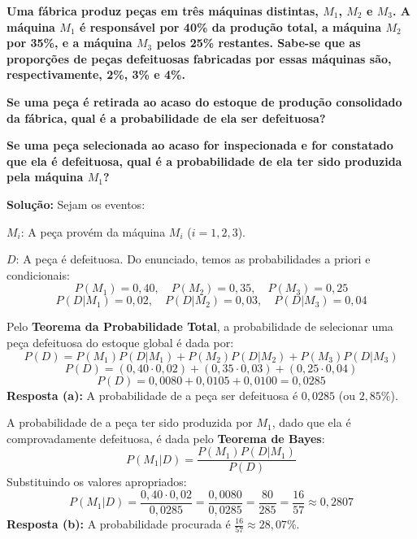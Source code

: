 \documentclass[a4paper,10pt,landscape,twocolumn]{article}  %
\let\oldenumerate\enumerate
\let\oldendenumerate\endenumerate
\renewenvironment{enumerate}{%
  \oldenumerate%
  \setlength{\itemsep}{1pt}%
  \setlength{\parskip}{0pt}%
  \setlength{\parsep}{0pt}%
  \setlength{\topsep}{2pt}%
  \setlength{\partopsep}{0pt}%
}{%
  \oldendenumerate%
}
\let\olditemize\itemize
\let\oldenditemize\enditemize
\renewenvironment{itemize}{%
  \olditemize%
  \setlength{\itemsep}{1pt}%
  \setlength{\parskip}{0pt}%
  \setlength{\parsep}{0pt}%
  \setlength{\topsep}{2pt}%
  \setlength{\partopsep}{0pt}%
}{%
  \oldenditemize%
}
\begin{document}
\begin{enumerate}
    \item \textbf{Uma fábrica produz peças em três máquinas distintas, $M_1$, $M_2$ e $M_3$. A máquina $M_1$ é responsável por 40\% da produção total, a máquina $M_2$ por 35\%, e a máquina $M_3$ pelos 25\% restantes. Sabe-se que as proporções de peças defeituosas fabricadas por essas máquinas são, respectivamente, 2\%, 3\% e 4\%.}
    \begin{enumerate}
        \item \textbf{Se uma peça é retirada ao acaso do estoque de produção consolidado da fábrica, qual é a probabilidade de ela ser defeituosa?}
        \item \textbf{Se uma peça selecionada ao acaso for inspecionada e for constatado que ela é defeituosa, qual é a probabilidade de ela ter sido produzida pela máquina $M_1$?}
    \end{enumerate}
    
    \textbf{Solução:}
    Sejam os eventos:
    \begin{itemize}
        \item $M_i$: A peça provém da máquina $M_i$ ($i = 1, 2, 3$).
        \item $D$: A peça é defeituosa.
    \end{itemize}
    Do enunciado, temos as probabilidades a priori e condicionais:
    \[ P(M_1) = 0{,}40, \quad P(M_2) = 0{,}35, \quad P(M_3) = 0{,}25 \]
    \[ P(D|M_1) = 0{,}02, \quad P(D|M_2) = 0{,}03, \quad P(D|M_3) = 0{,}04 \]
    
    \begin{enumerate}
        \item Pelo \textbf{Teorema da Probabilidade Total}, a probabilidade de selecionar uma peça defeituosa do estoque global é dada por:
        \[ P(D) = P(M_1)P(D|M_1) + P(M_2)P(D|M_2) + P(M_3)P(D|M_3) \]
        \[ P(D) = (0{,}40 \cdot 0{,}02) + (0{,}35 \cdot 0{,}03) + (0{,}25 \cdot 0{,}04) \]
        \[ P(D) = 0{,}0080 + 0{,}0105 + 0{,}0100 = 0{,}0285 \]
        \textbf{Resposta (a):} A probabilidade de a peça ser defeituosa é $0{,}0285$ (ou $2{,}85\%$).
        
        \item A probabilidade de a peça ter sido produzida por $M_1$, dado que ela é comprovadamente defeituosa, é dada pelo \textbf{Teorema de Bayes}:
        \[ P(M_1|D) = \frac{P(M_1)P(D|M_1)}{P(D)} \]
        Substituindo os valores apropriados:
        \[ P(M_1|D) = \frac{0{,}40 \cdot 0{,}02}{0{,}0285} = \frac{0{,}0080}{0{,}0285} = \frac{80}{285} = \frac{16}{57} \approx 0{,}2807 \]
        \textbf{Resposta (b):} A probabilidade procurada é $\frac{16}{57} \approx 28{,}07\%$.
    \end{enumerate}

\end{enumerate}
\end{document}
